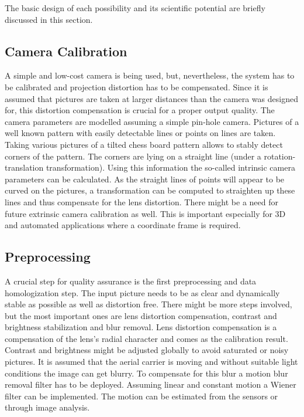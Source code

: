 \noindent
The basic design of each possibility and its scientific potential are briefly discussed in this section.

\subsection{Camera Calibration}

A simple and low-cost camera is being used, but, nevertheless, the system has to be calibrated and projection distortion has to be compensated. Since it is assumed that pictures are taken at larger distances than the camera was designed for, this distortion compensation is crucial for a proper output quality. The camera parameters are modelled assuming a simple pin-hole camera. Pictures of a well known pattern with easily detectable lines or points on lines are taken. Taking various pictures of a tilted chess board pattern allows to stably detect corners of the pattern. The corners are lying on a straight line (under a rotation-translation transformation). Using this information the so-called intrinsic camera parameters can be calculated. As the straight lines of points will appear to be curved on the pictures, a transformation can be computed to straighten up these lines and thus compensate for the lens distortion. There might be a need for future extrinsic camera calibration as well. This is important especially for 3D and automated applications where a coordinate frame is required.

\subsection{Preprocessing}
\label{sec:preprocessing}

A crucial step for quality assurance is the first preprocessing and data homologization step. The input picture needs to be as clear and dynamically stable as possible as well as distortion free. There might be more steps involved, but the most important ones are lens distortion compensation, contrast and brightness stabilization and blur removal. Lens distortion compensation is a compensation of the lens's radial character and comes as the calibration result. Contrast and brightness might be adjusted globally to avoid saturated or noisy pictures. It is assumed that the aerial carrier is moving and without suitable light conditions the image can get blurry. To compensate for this blur a motion blur
removal filter has to be deployed. Assuming linear and constant motion a Wiener filter can be implemented. The motion
can be estimated from the sensors or through image analysis. 

